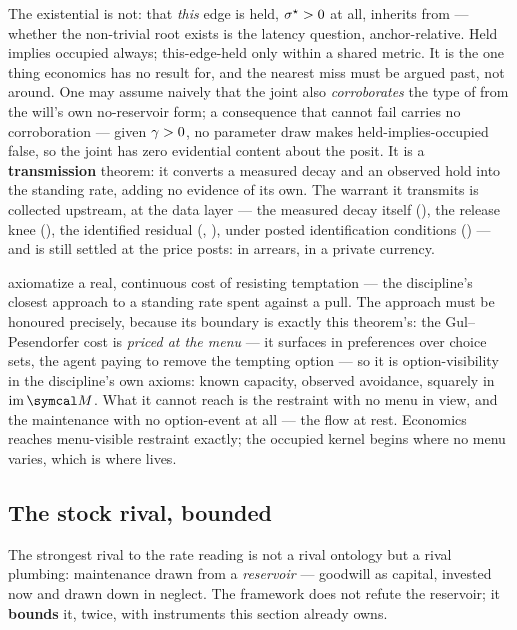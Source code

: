 \documentclass[../main]{subfiles}
\begin{document}
The existential is not: that \emph{this} edge is held, $\sigma\sp{\star}>0$ at all, inherits
 from  --- whether the non-trivial root exists is the latency
question, anchor-relative. Held implies occupied always; this-edge-held only within a shared
metric. It is the one thing economics has no result for, and the nearest miss must be
argued past, not around. One may assume naively that the joint also \emph{corroborates}
the type of  from the will's own no-reservoir form; a consequence that
cannot fail carries no corroboration --- given $\gamma>0$, no parameter draw makes
held-implies-occupied false, so the joint has zero evidential content about the posit.
It is a \textbf{transmission} theorem: it converts a measured decay and an observed hold
into the standing rate, adding no evidence of its own. The warrant it transmits is
collected upstream, at the data layer --- the measured decay itself
(), the release knee (), the identified residual
(, ), under posted identification conditions ()
--- and is still settled at the price  posts: in arrears, in a private
currency.

\begin{econ}[label=e:menus, title={Self-control priced at the menu}, ref=J:occ,
  cites={a:gulpesendorfer}, departs=wall,
  stopsat={reaches menu-visible restraint exactly; stops where no menu varies}]
  \textcite{a:gulpesendorfer} axiomatize a real, continuous cost of resisting temptation
  --- the discipline's closest approach to a standing rate spent against a pull. The
  approach must be honoured precisely, because its boundary is exactly this theorem's:
  the Gul--Pesendorfer cost is \emph{priced at the menu} --- it surfaces in preferences
  over choice sets, the agent paying to remove the tempting option --- so it is
  option-visibility in the discipline's own axioms: known capacity, observed avoidance,
  squarely in $\mathrm{im}\,\readout$. What it cannot reach is the restraint with no
  menu in view, and the maintenance with no option-event at all --- the flow at rest.
  Economics reaches menu-visible restraint exactly; the occupied kernel begins where no
  menu varies, which is where  lives.
\end{econ}

\subsection{The stock rival, bounded}
\label{subsec:maint:stock}
%
The strongest rival to the rate reading is not a rival ontology but a rival plumbing:
maintenance drawn from a \emph{reservoir} --- goodwill as capital, invested now and
drawn down in neglect. The framework does not refute the reservoir; it \textbf{bounds}
it, twice, with instruments this section already owns.
\end{document}
